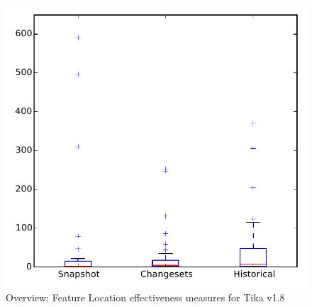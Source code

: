 
\begin{figure}
\centering
\includegraphics[height=0.4\textheight]{figures/flt/all_tika}
\caption{Overview: Feature Location effectiveness measures for Tika v1.8}
\label{fig:flt:all:tika}
\end{figure}
